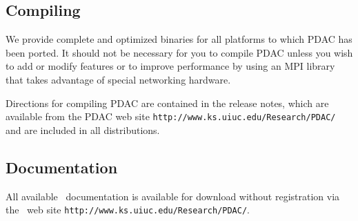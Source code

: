 \subsection{Compiling \PDAC}

We provide complete and optimized binaries for all
platforms to which PDAC has been ported.
It should not be necessary for you to compile
PDAC unless you wish to add or modify features
or to improve performance by using an MPI library
that takes advantage of special networking hardware.

Directions for compiling PDAC are contained in the release notes,
which are available from the PDAC web site
{\tt http://www.ks.uiuc.edu/Research/PDAC/}
and are included in all distributions.

\subsection{Documentation}

All available \PDAC\ documentation is available for download without
registration via the \PDAC\ web site
{\tt http://www.ks.uiuc.edu/Research/PDAC/}.

